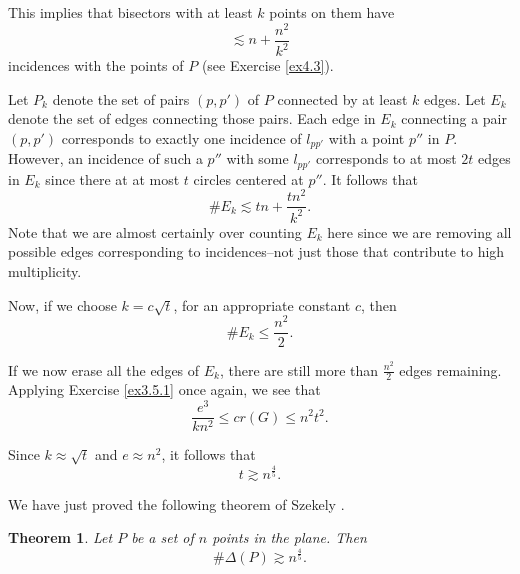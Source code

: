 \documentclass[]{amsart}
\numberwithin{equation}{section}
\theoremstyle{plain}
\newtheorem{theorem}{Theorem}[section]
\theoremstyle{definition}
\theoremstyle{remark}
\begin{document}
This implies that bisectors with at least $k$ points on them have
\begin{equation} \label{richlines2}
\lesssim n+\frac{n^2}{k^2}
\end{equation}
incidences with the points of $P$ (see Exercise \ref{ex4.3}).  


Let $P_k$ denote the set of pairs $(p,p')$ of $P$ connected by
at least $k$ edges. Let $E_k$ denote the set of edges connecting
those pairs. Each edge in $E_k$ connecting a pair $(p,p')$
corresponds to exactly one incidence of $l_{pp'}$ with a point
$p''$ in $P$. However, an incidence of such a $p''$ with some
$l_{pp'}$ corresponds to at most $2t$ edges in $E_k$ since there
at at most $t$ circles centered at $p''$. It follows that
\begin{equation}
 \# E_k \lesssim tn+\frac{tn^2}{k^2}.
\end{equation}
Note that we are almost certainly over counting $E_k$ here since we are removing all possible edges corresponding to incidences--not just those that contribute to high multiplicity.


Now, if we choose $k=c\sqrt{t}$, for an appropriate constant $c$, then
\begin{equation}
 \# E_k \leq \frac{n^2}{2}.
\end{equation}



If we now erase all the edges of $E_k$, there are still more than
$\frac{n^2}{2}$ edges remaining. Applying Exercise \ref{ex3.5.1}
once again, we see that
\begin{equation}
\frac{e^3}{kn^2} \leq cr(G) \leq n^2t^2.
\end{equation}



Since $k \approx \sqrt{t}$ and $e \approx n^2$, it follows that
\begin{equation}
t \gtrsim n^{\frac{4}{5}}.
\end{equation}



We have just proved the following theorem of Szekely \cite{Sze}.

\begin{theorem} \label{szekely.thm}
Let $P$ be a set of $n$ points in the plane. Then
\begin{equation}
\# \Delta(P) \gtrsim n^{\frac{4}{5}}.
\end{equation}
\end{theorem}

\end{document}
